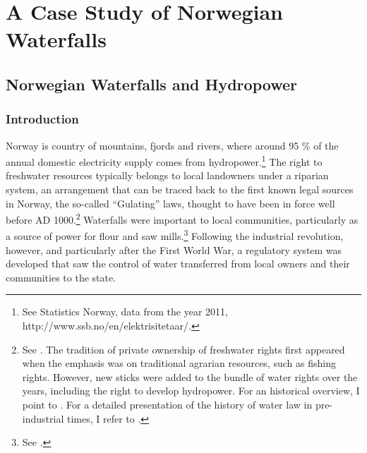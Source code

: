 \part{A Case Study of Norwegian Waterfalls}

\chapter{Norwegian Waterfalls and Hydropower}\label{chap:3}

\section{Introduction}\label{sec:into3}

Norway is country of mountains, fjords and rivers, where around 95 \% of the annual domestic electricity supply comes from hydropower.\footnote{See Statistics Norway, data from the year 2011, http://www.ssb.no/en/elektrisitetaar/.} The right to freshwater resources typically belongs to local landowners under a riparian system, an arrangement that can be traced back to the first known legal sources in Norway, the so-called ``Gulating'' laws, thought to have been in force well before AD 1000.\footnote{See \cite[111-112,120]{robberstad81}. The tradition of private ownership of freshwater rights first appeared when the emphasis was on traditional agrarian resources, such as fishing rights. However, new sticks were added to the bundle of water rights over the years, including the right to develop hydropower. For an historical overview, I point to \cite[14-32]{vislie44}. For a detailed presentation of the history of water law in pre-industrial times, I refer to \cite{motzfeld08}. } Waterfalls were important to local communities, particularly as a source of power for flour and saw mills.\footnote{See \cite[121]{tvedt13}.} Following the industrial revolution, however, and particularly after the First World War, a regulatory system was developed that saw the control of water transferred from local owners and their communities to the state.

